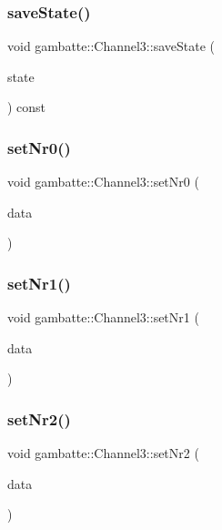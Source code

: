 \subsubsection{\texorpdfstring{save\+State()}{saveState()}}
{\footnotesize\ttfamily void gambatte\+::\+Channel3\+::save\+State (\begin{DoxyParamCaption}\item[{\hyperlink{structgambatte_1_1SaveState}{Save\+State} \&}]{state }\end{DoxyParamCaption}) const}

\mbox{\label{classgambatte_1_1Channel3_ac54d37c29e7a35ab2394fe185f796758}} 
\subsubsection{\texorpdfstring{set\+Nr0()}{setNr0()}}
{\footnotesize\ttfamily void gambatte\+::\+Channel3\+::set\+Nr0 (\begin{DoxyParamCaption}\item[{unsigned}]{data }\end{DoxyParamCaption})}

\mbox{\label{classgambatte_1_1Channel3_a4530b1049b8ba6e64c761a286b605f6f}} 
\subsubsection{\texorpdfstring{set\+Nr1()}{setNr1()}}
{\footnotesize\ttfamily void gambatte\+::\+Channel3\+::set\+Nr1 (\begin{DoxyParamCaption}\item[{unsigned}]{data }\end{DoxyParamCaption})\hspace{0.3cm}{\ttfamily [inline]}}

\mbox{\label{classgambatte_1_1Channel3_abf6fece5005b23c8accc5a6f9af62a39}} 
\subsubsection{\texorpdfstring{set\+Nr2()}{setNr2()}}
{\footnotesize\ttfamily void gambatte\+::\+Channel3\+::set\+Nr2 (\begin{DoxyParamCaption}\item[{unsigned}]{data }\end{DoxyParamCaption})}

